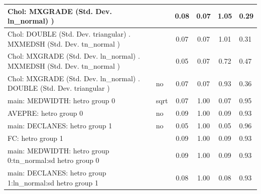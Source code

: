 \begin{table}
\begin{center}
\begin{tabular}{|l|l|c|c|c|l|}
			\hline
			 Chol: MXGRADE (Std. Dev. ln_normal) ) &  & 0.08 & 0.07 & 1.05 & 0.29 \\
			\hline
			 Chol: DOUBLE (Std. Dev. triangular) . MXMEDSH (Std. Dev.   tn_normal ) &  & 0.07 & 0.07 & 1.01 & 0.31 \\
			\hline
			 Chol: MXGRADE (Std. Dev. ln_normal) . MXMEDSH (Std. Dev.   tn_normal ) &  & 0.05 & 0.07 & 0.72 & 0.47 \\
			\hline
			 Chol: MXGRADE (Std. Dev. ln_normal) . DOUBLE (Std. Dev.   triangular ) & no & 0.07 & 0.07 & 0.93 & 0.36 \\
			\hline
			main: MEDWIDTH: hetro group 0 & sqrt & 0.07 & 1.00 & 0.07 & 0.95 \\
			\hline
			AVEPRE: hetro group 0 & no & 0.09 & 1.00 & 0.09 & 0.93 \\
			\hline
			main: DECLANES: hetro group 1 & no & 0.05 & 1.00 & 0.05 & 0.96 \\
			\hline
			FC: hetro group 1 &  & 0.09 & 1.00 & 0.09 & 0.93 \\
			\hline
			main: MEDWIDTH: hetro group 0:tn_normal:sd  hetro group 0 &  & 0.09 & 1.00 & 0.09 & 0.93 \\
			\hline
			main: DECLANES: hetro group 1:ln_normal:sd  hetro group 1 &  & 0.08 & 1.00 & 0.08 & 0.93 \\
			\hline
		\end{tabular}
	\end{center}
\end{table}